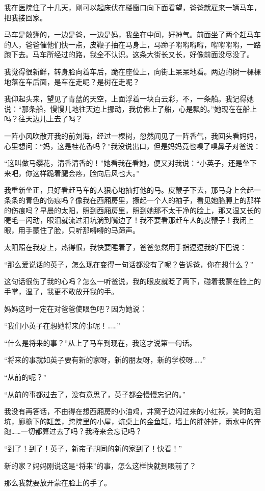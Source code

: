 \par 我在医院住了十几天，刚可以起床伏在楼窗口向下面看望，爸爸就雇来一辆马车，把我接回家。
\par 马车是敞篷的，一边是爸，一边是妈，我坐在中间，好神气。前面坐了两个赶马车的人，爸爸催他们快一点，皮鞭子抽在马身上，马蹄子嘚嘚嘚嘚，嘚嘚嘚嘚，一路跑下去。马车所经过的路，我全不认识。这条大街长又长，好像前面没尽没了。
\par 我觉得很新鲜，转身脸向着车后，跪在座位上，向街上呆呆地看。两边的树一棵棵地落在车后面，是车在走呢？是树在走呢？
\par 我仰起头来，望见了青蓝的天空，上面浮着一块白云彩，不，一条船。我记得她说：“那条船，慢慢儿地往天边上挪动，我仿佛上了船，心是飘的。”她现在在船上吗？往天边儿上去了吗？
\par 一阵小风吹散开我的前刘海，经过一棵树，忽然闻见了一阵香气，我回头看妈妈，心里想问：“妈，这是桂花香吗？”我没说出口，但是妈妈竟也嗅了嗅鼻子对爸说：
\par “这叫做马缨花，清香清香的！”她看我在看她，便又对我说：“小英子，还是坐下来吧，你这样跪着腿会疼，脸向后风也大。”
\par 我重新坐正，只好看赶马车的人狠心地抽打他的马。皮鞭子下去，那马身上会起一条条的青色的伤痕吗？像我在西厢房里，撩起一个人的袖子，看见她胳膊上的那样的伤痕吗？早晨的太阳，照到西厢房里，照到她那不太干净的脸上，那又湿又长的睫毛一闪动，眼泪就流过泪坑淌到嘴边了！我不要看那赶车人的皮鞭子！我闭上眼，用手蒙住了脸，只听那嘚嘚的马蹄声。
\par 太阳照在我身上，热得很，我快要睡着了，爸爸忽然用手指逗逗我的下巴说：
\par “那么爱说话的英子，怎么现在变得一句话都没有了呢？告诉爸，你在想什么？”
\par 这句话很伤了我的心吗？怎么一听爸说，我的眼皮就眨了两下，碰着我蒙在脸上的手掌，湿了，我更不敢放开我的手。
\par 妈妈这时一定在对爸爸使眼色吧？因为她说：
\par “我们小英子在想她将来的事呢！……”
\par “什么是将来的事？”从上了马车到现在，我这才说第一句话。
\par “将来的事就如英子要有新的家呀，新的朋友呀，新的学校呀……”
\par “从前的呢？”
\par “从前的事都过去了，没有意思了，英子都会慢慢忘记的。”
\par 我没有再答话，不由得在想西厢房的小油鸡，井窝子边闪过来的小红袄，笑时的泪坑，廊檐下的缸盖，跨院里的小屋，炕桌上的金鱼缸，墙上的胖娃娃，雨水中的奔跑……一切都算过去了吗？我将来会忘记吗？
\par “到了！到了！英子，新帘子胡同的新的家到了！快看！”
\par 新的家？妈妈刚说这是“将来”的事，怎么这样快就到眼前了？
\par 那么我就要放开蒙在脸上的手了。













